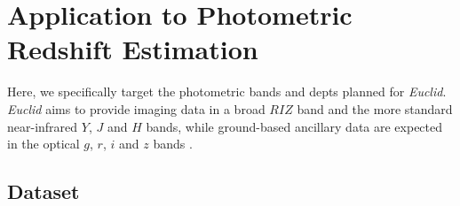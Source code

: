 \documentclass[useAMS,usenatbib,fleqn]{mn2e}
\begin{document}
\section{Application to Photometric Redshift Estimation}
\label{sec-application}

Here, we specifically target the photometric bands and depts planned for {\em Euclid}. {\em Euclid} aims to provide imaging data in a broad $RIZ$ band and the more standard near-infrared $Y$, $J$ and $H$ bands, while ground-based ancillary data are expected in the optical $g$, $r$, $i$ and $z$ bands \citep{laureijs2011}. 


\subsection{Dataset}
\label{sec-dataset}
\end{document}
